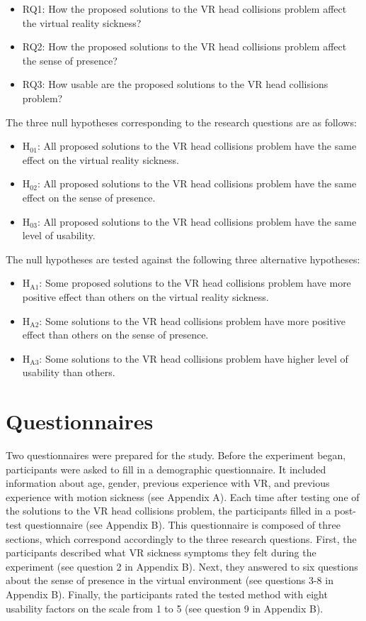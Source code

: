 \begin{itemize}
\item RQ1: How the proposed solutions to the VR head collisions problem affect the virtual reality sickness?
\item RQ2: How the proposed solutions to the VR head collisions problem affect the sense of presence?
\item RQ3: How usable are the proposed solutions to the VR head collisions problem?
\end{itemize}

The three null hypotheses corresponding to the research questions are as follows:

\begin{itemize}
\item H$_{\text{01}}$: All proposed solutions to the VR head collisions problem have the same effect on the virtual reality sickness.
\item H$_{\text{02}}$: All proposed solutions to the VR head collisions problem have the same effect on the sense of presence.
\item H$_{\text{03}}$: All proposed solutions to the VR head collisions problem have the same level of usability.
\end{itemize}

The null hypotheses are tested against the following three alternative hypotheses:

\begin{itemize}
\item H$_{\text{A1}}$: Some proposed solutions to the VR head collisions problem have more positive effect than others on the virtual reality sickness.
\item H$_{\text{A2}}$: Some solutions to the VR head collisions problem have more positive effect than others on the sense of presence.
\item H$_{\text{A3}}$: Some solutions to the VR head collisions problem have higher level of usability than others.
\end{itemize}

\section{Questionnaires}

Two questionnaires were prepared for the study. Before the experiment began, participants were asked to fill in a demographic questionnaire. It included information about age, gender, previous experience with VR, and previous experience with motion sickness (see Appendix A). Each time after testing one of the solutions to the VR head collisions problem, the participants filled in a post-test questionnaire (see Appendix B). This questionnaire is composed of three sections, which correspond accordingly to the three research questions. First, the participants described what VR sickness symptoms they felt during the experiment (see question 2 in Appendix B). Next, they answered to six questions about the sense of presence in the virtual environment (see questions 3-8 in Appendix B). Finally, the participants rated the tested method with eight usability factors on the scale from 1 to 5 (see question 9 in Appendix B).

